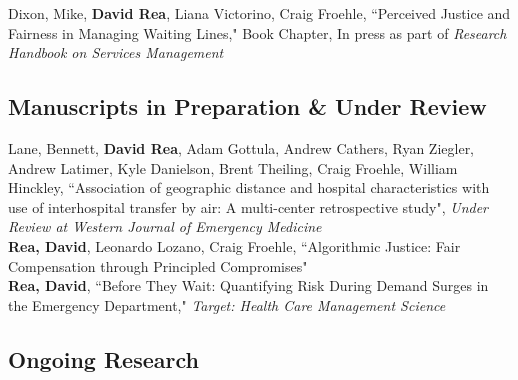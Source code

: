 \documentclass[12pt, letter]{moderncv}
\begin{document}
\medskip
Dixon, Mike, \textbf{David Rea}, Liana Victorino, Craig Froehle, ``Perceived Justice and Fairness in Managing Waiting Lines," Book Chapter, \newline In press as part of \textit{Research Handbook on Services Management}


\subsection{Manuscripts in Preparation \& Under Review}
\smallskip
Lane, Bennett, \textbf{David Rea}, Adam Gottula, Andrew Cathers, Ryan Ziegler,  Andrew Latimer,  Kyle Danielson, Brent Theiling, Craig Froehle, William Hinckley,  ``Association of geographic distance and hospital characteristics with use of interhospital transfer by air: A multi-center retrospective study", \textit{Under Review at Western Journal of Emergency Medicine}
\medskip\\
\textbf{Rea, David}, Leonardo Lozano, Craig Froehle,  ``Algorithmic Justice: Fair Compensation through Principled Compromises" \textit{}
\medskip\\
\textbf{Rea, David}, ``Before They Wait: Quantifying Risk During Demand Surges in the Emergency Department," \textit{Target: Health Care Management Science}
\medskip\\
%

\subsection{Ongoing Research}
\end{document}
